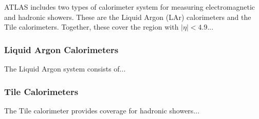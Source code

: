 ﻿ATLAS includes two types of calorimeter system for measuring electromagnetic and hadronic showers.
These are the Liquid Argon (LAr) calorimeters and the Tile calorimeters.
Together, these cover the region with $|\eta| < 4.9$...

\subsubsection{Liquid Argon Calorimeters} \label{sec:lar}

The Liquid Argon system consists of...

\subsubsection{Tile Calorimeters}

The Tile calorimeter provides coverage for hadronic showers...
